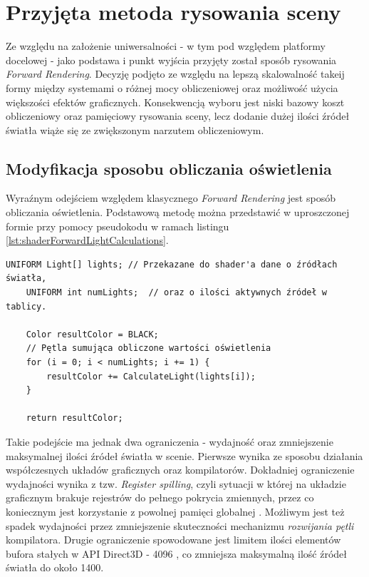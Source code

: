\chapter{Przyjęta metoda rysowania sceny}
\label{ChapterSceneDrawingMethod}
	Ze względu na założenie uniwersalności - w tym pod względem platformy docelowej - jako podstawa i punkt wyjścia przyjęty został sposób rysowania \textit{Forward Rendering}. Decyzję podjęto ze względu na lepszą skalowalność takeij formy między systemami o różnej mocy obliczeniowej oraz możliwość użycia większości efektów graficznych. Konsekwencją wyboru jest niski bazowy koszt obliczeniowy oraz pamięciowy rysowania sceny, lecz dodanie dużej ilości źródeł światła wiąże się ze zwiększonym narzutem obliczeniowym.
	
\section{Modyfikacja sposobu obliczania oświetlenia}
	Wyraźnym odejściem względem klasycznego \textit{Forward Rendering} jest sposób obliczania oświetlenia. Podstawową metodę można przedstawić w uproszczonej formie przy pomocy pseudokodu w ramach listingu \ref{lst:shaderForwardLightCalculations}.
	
	\begin{lstlisting}[caption={Pseudokod programu cieniującego obliczającego oświetlenie metodą Forward Rendering}, label={lst:shaderForwardLightCalculations}]
	UNIFORM Light[] lights; // Przekazane do shader'a dane o źródłach światła,
	UNIFORM int numLights;  // oraz o ilości aktywnych źródeł w tablicy.
		
	Color resultColor = BLACK;
	// Pętla sumująca obliczone wartości oświetlenia
	for (i = 0; i < numLights; i += 1) {
		resultColor += CalculateLight(lights[i]);
	}
	
	return resultColor; 
	\end{lstlisting}
	
	Takie podejście ma jednak dwa ograniczenia - wydajność oraz zmniejszenie maksymalnej ilości źródeł światła w scenie.	Pierwsze wynika ze sposobu działania współczesnych układów graficznych oraz kompilatorów. Dokładniej ograniczenie wydajności wynika z tzw. \textit{Register spilling}, czyli sytuacji w której na układzie graficznym brakuje rejestrów do pełnego pokrycia zmiennych, przez co koniecznym jest korzystanie z powolnej pamięci globalnej \cite{amd:gpuopen:RegisterSpilling}. Możliwym jest też spadek wydajności przez zmniejszenie skuteczności mechanizmu \textit{rozwijania pętli} kompilatora. Drugie ograniczenie spowodowane jest limitem ilości elementów bufora stałych w API Direct3D - 4096 \cite{microsoft:Direct3D11:ResourceLimits}, co zmniejsza maksymalną ilość źródeł światła do około 1400. 
	
